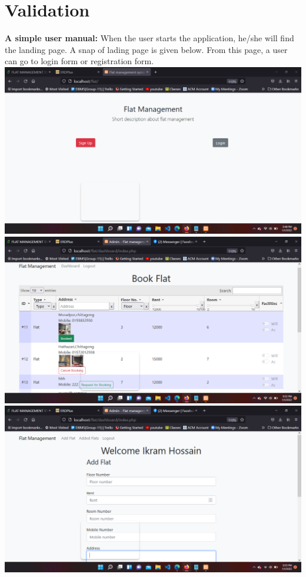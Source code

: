 \section{Validation} \label{sec:val}
\textbf{A simple user manual: }
When the user starts the application, he/she will find the landing page. A snap of lading page is given below. From this page, a user can go to login form or registration form.\\
\includegraphics[width=1\textwidth, inner]{images/flat1.png}\\
\includegraphics[width=1\textwidth, inner]{images/flat2.png}\\
\includegraphics[width=1\textwidth, inner]{images/flat3.png}\\
